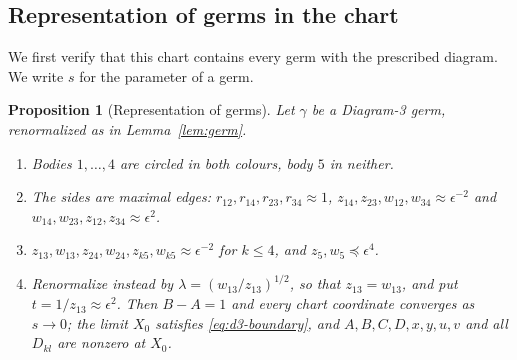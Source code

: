 \documentclass[Threeside,11pt]{article}
\newtheorem{proposition}[theorem]{Proposition}
\theoremstyle{definition}
\theoremstyle{remark}
\numberwithin{equation}{section}
\theoremstyle{remark}
\newenvironment{romanlist}{\begin{enumerate}\renewcommand{\labelenumi}{(\roman{enumi})}%
  \renewcommand{\theenumi}{\roman{enumi}}}{\end{enumerate}}
\begin{document}
\subsection{Representation of germs in the chart}
{We first verify that this chart contains every germ with the prescribed diagram.
We write $s$ for the parameter of a germ.}

\begin{proposition}[Representation of germs]\label{prop:d3-cover}
Let $\gamma$ be a Diagram-3 germ, renormalized as in Lemma~\ref{lem:germ}.
\begin{romanlist}
  \item Bodies $1,\dots,4$ are circled in both colours, body $5$ in neither.
  \item The sides are maximal edges: $r_{12},r_{14},r_{23},r_{34}\approx1$,
  $z_{14},z_{23},w_{12},w_{34}\approx\epsilon^{-2}$ and $w_{14},w_{23},z_{12},z_{34}\approx\epsilon^2$.
  \item $z_{13},w_{13},z_{24},w_{24},z_{k5},w_{k5}\approx\epsilon^{-2}$ for $k\le4$, and
  $z_5,w_5\preccurlyeq\epsilon^4$.
  \item Renormalize instead by $\lambda=(w_{13}/z_{13})^{1/2}$, so that $z_{13}=w_{13}$, and put
  $t=1/z_{13}\approx\epsilon^2$.  Then $B-A=1$ and every chart coordinate converges as $s\to0$; the
  limit $X_0$ satisfies \eqref{eq:d3-boundary}, and $A,B,C,D,x,y,u,v$ and all $D_{kl}$ are
  nonzero at $X_0$.
\end{romanlist}
\end{proposition}
\end{document}
